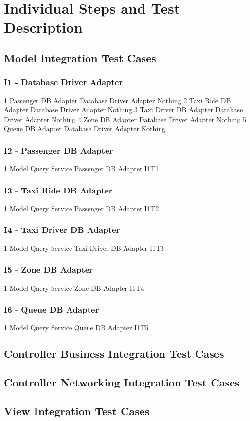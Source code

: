 \section{Individual Steps and Test Description}

\subsection{Model Integration Test Cases}
\subsubsection{I1 - Database Driver Adapter}
\testCaseSimpleSimple
	{1}
	{Passenger DB Adapter}
	{Database Driver Adapter}
	{Nothing}
\testCaseSimpleSimple
	{2}
	{Taxi Ride DB Adapter}
	{Database Driver Adapter}
	{Nothing}
\testCaseSimpleSimple
	{3}
	{Taxi Driver DB Adapter}
	{Database Driver Adapter}
	{Nothing}
\testCaseSimpleSimple
	{4}
	{Zone DB Adapter}
	{Database Driver Adapter}
	{Nothing}
\testCaseSimpleSimple
	{5}
	{Queue DB Adapter}
	{Database Driver Adapter}
	{Nothing}
\subsubsection{I2 - Passenger DB Adapter}
\testCaseSimpleSimple
	{1}
	{Model Query Service}
	{Passenger DB Adapter}
	{I1T1}
\subsubsection{I3 - Taxi Ride DB Adapter}
\testCaseSimpleSimple
	{1}
	{Model Query Service}
	{Passenger DB Adapter}
	{I1T2}
\subsubsection{I4 - Taxi Driver DB Adapter}
\testCaseSimpleSimple
	{1}
	{Model Query Service}
	{Taxi Driver DB Adapter}
	{I1T3}
\subsubsection{I5 - Zone DB Adapter}
\testCaseSimpleSimple
	{1}
	{Model Query Service}
	{Zone DB Adapter}
	{I1T4}
\subsubsection{I6 - Queue DB Adapter}
\testCaseSimpleSimple
	{1}
	{Model Query Service}
	{Queue DB Adapter}
	{I1T5}
\subsection{Controller Business Integration Test Cases}
\subsection{Controller Networking Integration Test Cases}
\subsection{View Integration Test Cases}